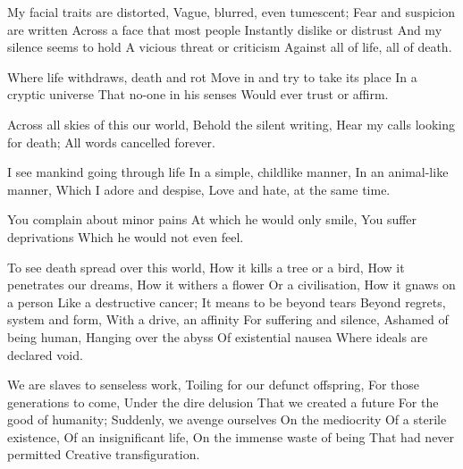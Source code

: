 \documentclass{article}
\newenvironment{stanza}{\begin{minipage}{10cm}\obeylines}{\end{minipage}\vspace{\baselineskip}}
\begin{document}
\begin{stanza}
My facial traits are distorted,
Vague, blurred, even tumescent;
Fear and suspicion are written
Across a face that most people
Instantly dislike or distrust
And my silence seems to hold
A vicious threat or criticism
Against all of life, all of death.
\end{stanza}

\begin{stanza}
Where life withdraws, death and rot
Move in and try to take its place
In a cryptic universe
That no-one in his senses
Would ever trust or affirm.
\end{stanza}

\begin{stanza}
Across all skies of this our world,
Behold the silent writing,
Hear my calls looking for death;
All words cancelled forever.
\end{stanza}


\begin{stanza}
I see mankind going through life
In a simple, childlike manner,
In an animal-like manner,
Which I adore and despise,
Love and hate, at the same time.
\end{stanza}

\begin{stanza}
You complain about minor pains
At which he would only smile,
You suffer deprivations
Which he would not even feel.
\end{stanza}


\begin{stanza}
To see death spread over this world,
How it kills a tree or a bird,
How it penetrates our dreams,
How it withers a flower
Or a civilisation,
How it gnaws on a person
Like a destructive cancer;
It means to be beyond tears
Beyond regrets, system and form,
With a drive, an affinity
For suffering and silence,
Ashamed of being human,
Hanging over the abyss
Of existential nausea
Where ideals are declared void.
\end{stanza}

\begin{stanza}
We are slaves to senseless work,
Toiling for our defunct offspring,
For those generations to come,
Under the dire delusion
That we created a future
For the good of humanity;
Suddenly, we avenge ourselves
On the mediocrity
Of a sterile existence,
Of an insignificant life,
On the immense waste of being
That had never permitted
Creative transfiguration.
\end{stanza}
\end{document}

